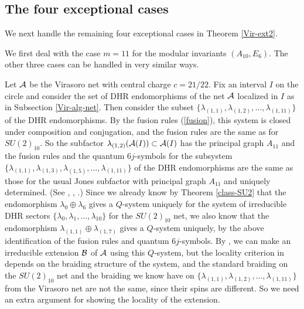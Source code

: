 \documentclass[12pt]{article}
\def\la{\lambda}
\def\N{{\cal A}}
\def\M{{\cal B}}
\begin{document}
\subsection{The four exceptional cases}

We next handle the remaining four exceptional cases in
Theorem \ref{Vir-ext2}.

We first deal with the case $m=11$ for the modular invariants
$(A_{10},E_6)$.
The other three cases can be handled in very similar ways.

Let $\N$ be the Virasoro net with central charge $c=21/22$.
Fix an interval $I$ on the circle and 
consider the set of DHR endomorphisms of the net $\N$
localized in $I$ as in Subsection \ref{Vir-alg-net}.
Then consider the subset $\{\la_{(1,1)},\la_{(1,2)},\dots,\la_{(1,11)}\}$
of the DHR endomorphisms.
By the fusion rules (\ref{fusion}), this system is closed under composition
and conjugation, and the fusion rules are the same as for
$SU(2)_{10}$.  So the subfactor $\la_{(1,2)}(\N(I))\subset \N(I)$
has the principal graph $A_{11}$ and the fusion rules and the
quantum $6j$-symbols for the subsystem
$\{\la_{(1,1)},\la_{(1,3)},\la_{(1,5)},\dots,\la_{(1,11)}\}$
of the DHR endomorphisms are the same as those for the usual
Jones subfactor with principal graph $A_{11}$ and uniquely
determined. (See \cite{O1}, \cite{K1},
\cite[Chapters 9--12]{EK}.) 
Since we already know by Theorem \ref{class-SU2} that
the endomorphism $\la_0\oplus\la_6$ gives a $Q$-system uniquely
for the system of irreducible DHR sectors
$\{\la_0,\la_1,\dots,\la_{10}\}$ for the $SU(2)_{10}$ net,
we also know that the endomorphism $\la_{(1,1)}\oplus\la_{(1,7)}$
gives a $Q$-system uniquely, by the above identification of
the fusion rules and quantum $6j$-symbols.  By \cite[Theorem 4.9]{LR},
we can make an irreducible extension $\M$ of $\N$ using this
$Q$-system, but the locality criterion in \cite[Theorem 4.9]{LR}
depends on the braiding structure of the system, and the
standard braiding on the $SU(2)_{10}$ net and the braiding
we know have on 
$\{\la_{(1,1)},\la_{(1,2)},\dots,\la_{(1,11)}\}$ from the Virasoro
net are not the same, since their spins are different.  So we need
an extra argument for showing the locality of the extension.
\end{document}
